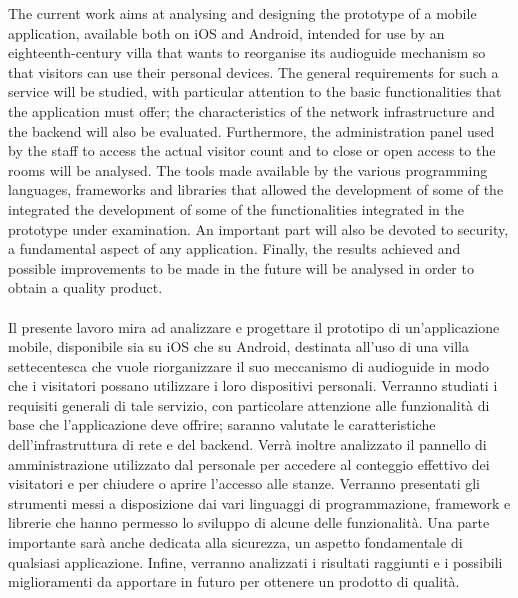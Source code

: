 The current work aims at analysing and designing the prototype of a mobile application, available both on iOS and Android, intended for use by an eighteenth-century villa that wants to reorganise its audioguide mechanism so that visitors can use their personal devices.
The general requirements for such a service will be studied, with particular attention to the basic functionalities that the application must offer; the characteristics of the network infrastructure and the backend will also be evaluated. Furthermore, the administration panel used by the staff to access the actual visitor count and to close or open access to the rooms will be analysed. The tools made available by the various programming languages, frameworks and libraries that allowed the development of some of the integrated
the development of some of the functionalities integrated in the prototype under examination. An important part will also be devoted to security, a fundamental aspect of any application. Finally, the results achieved and possible improvements to be made in the future will be analysed in order to obtain a quality product.\\\\
Il presente lavoro mira ad analizzare e progettare il prototipo di un'applicazione mobile, disponibile sia su iOS che su Android, destinata all'uso di una villa 
settecentesca che vuole riorganizzare il suo meccanismo di audioguide in modo che i visitatori possano utilizzare i loro dispositivi personali.
Verranno studiati i requisiti generali di tale servizio, con particolare attenzione alle funzionalità di base che l'applicazione deve offrire; saranno valutate le caratteristiche dell'infrastruttura di rete e del backend. Verrà inoltre analizzato il pannello di amministrazione utilizzato dal personale per accedere al conteggio effettivo %
dei visitatori e per chiudere o aprire l'accesso alle stanze. 
Verranno presentati gli strumenti messi a disposizione dai vari linguaggi di programmazione, framework e librerie che hanno permesso lo sviluppo di alcune delle funzionalità. Una parte importante sarà anche dedicata alla sicurezza, un aspetto fondamentale di qualsiasi applicazione. Infine, verranno analizzati i risultati raggiunti e i possibili miglioramenti da apportare in futuro per ottenere un prodotto di qualità.

